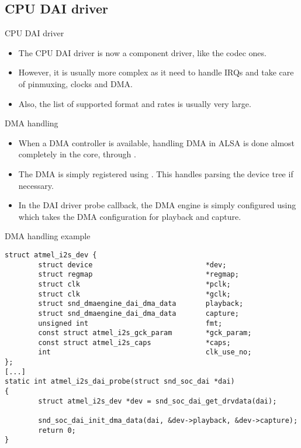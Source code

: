 \subsection{CPU DAI driver}

\begin{frame}{CPU DAI driver}
  \begin{itemize}
  \item The CPU DAI driver is now a component driver, like the codec
    ones.
  \item However, it is usually more complex as it need to handle IRQs
    and take care of pinmuxing, clocks and DMA.
  \item Also, the list of supported format and rates is usually very
    large.
  \end{itemize}
\end{frame}

\begin{frame}{DMA handling}
  \begin{itemize}
  \item When a DMA controller is available, handling DMA in ALSA is
    done almost completely in the core, through .
  \item The DMA is simply registered using
    . This handles parsing the
    device tree if necessary.
  \item In the DAI driver probe callback, the DMA engine is simply
    configured using  which takes the
    DMA configuration for playback and capture.
  \end{itemize}
\end{frame}

\begin{frame}[fragile]{DMA handling example}
  \begin{block}{}
    \fontsize{8}{7}\selectfont
    \begin{verbatim}
struct atmel_i2s_dev {
        struct device                           *dev;
        struct regmap                           *regmap;
        struct clk                              *pclk;
        struct clk                              *gclk;
        struct snd_dmaengine_dai_dma_data       playback;
        struct snd_dmaengine_dai_dma_data       capture;
        unsigned int                            fmt;
        const struct atmel_i2s_gck_param        *gck_param;
        const struct atmel_i2s_caps             *caps;
        int                                     clk_use_no;
};
[...]
static int atmel_i2s_dai_probe(struct snd_soc_dai *dai)
{
        struct atmel_i2s_dev *dev = snd_soc_dai_get_drvdata(dai);

        snd_soc_dai_init_dma_data(dai, &dev->playback, &dev->capture);
        return 0;
}
    \end{verbatim}
  \end{block}
\end{frame}

